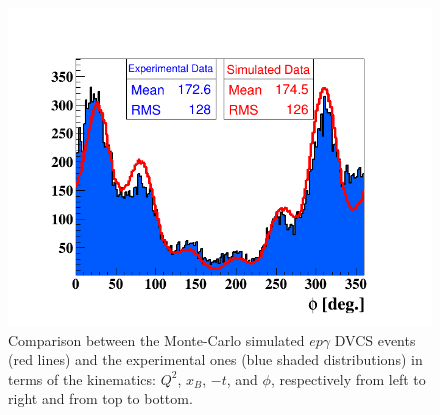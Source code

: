 \begin{figure}[h!]
\includegraphics[scale=0.35]{fig_dvcs/comp/phi_h_InCoh.png}
\caption{Comparison between the Monte-Carlo simulated $ep\gamma$ DVCS events (red lines) and the experimental ones (blue shaded distributions) in terms of the kinematics: $Q^{2}$, $x_{B}$, $-t$, and $\phi$, respectively from left to right and from top to bottom.}
\label{fig:incoh_coparison_with_simulation_1}
\end{figure}


